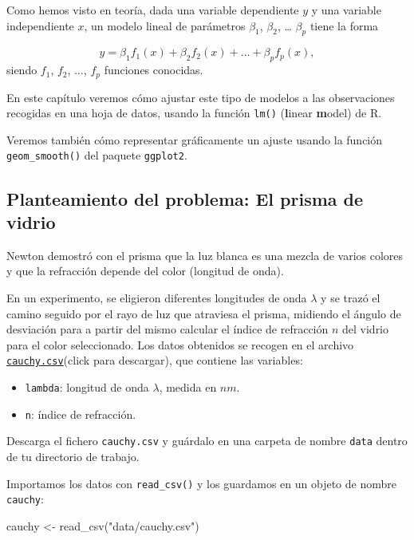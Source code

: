 \documentclass[
  degree=mecinf,
  title=normal,
  toc=normal,
  bib=normal]{mnye}
\newenvironment{Shaded}{\begin{snugshade}}{\end{snugshade}}
\newcommand{\FunctionTok}[1]{\textcolor[rgb]{0.00,0.00,0.00}{#1}}
\newcommand{\NormalTok}[1]{#1}
\newcommand{\OtherTok}[1]{\textcolor[rgb]{0.56,0.35,0.01}{#1}}
\newcommand{\StringTok}[1]{\textcolor[rgb]{0.31,0.60,0.02}{#1}}
\begin{document}
Como hemos visto en teoría, dada una variable dependiente \(y\) y una variable independiente \(x\), un modelo lineal de parámetros \(\beta_1\), \(\beta_2\), \ldots{} \(\beta_p\) tiene la forma

\[
y = \beta_1 f_1(x) + \beta_2 f_2(x) + \dots +\beta_p f_p(x),
\]
siendo \(f_1\), \(f_2\), \(\dots\), \(f_p\) funciones conocidas.

En este capítulo veremos cómo ajustar este tipo de modelos a las observaciones recogidas en una hoja de datos, usando la función \texttt{lm()} (\textbf{l}inear \textbf{m}odel) de \textsf{R}.

Veremos también cómo representar gráficamente un ajuste usando la función \texttt{geom\_smooth()} del paquete \texttt{ggplot2}.

\hypertarget{planteamiento-del-problema-el-prisma-de-vidrio}{%
\subsection{Planteamiento del problema: El prisma de vidrio}\label{planteamiento-del-problema-el-prisma-de-vidrio}}

Newton demostró con el prisma que la luz blanca es una mezcla de varios colores y que la refracción depende del color (longitud de onda).

En un experimento, se eligieron diferentes longitudes de onda \(\lambda\) y se trazó el camino seguido por el rayo de luz que atraviesa el prisma, midiendo el ángulo de desviación para a partir del mismo calcular el índice de refracción \(n\) del vidrio para el color seleccionado. Los datos obtenidos se recogen en el archivo \href{https://drive.google.com/uc?export=download\&id=1fI5_KZA8MAiZVegFmtlQ7Cm4IzlGDQtg}{\texttt{cauchy.csv}}(click para descargar), que contiene las variables:

\begin{itemize}
\item
  \texttt{lambda}: longitud de onda \(\lambda\), medida en \(nm\).
\item
  \texttt{n}: índice de refracción.
\end{itemize}

Descarga el fichero \texttt{cauchy.csv} y guárdalo en una carpeta de nombre \texttt{data} dentro de tu directorio de trabajo.

Importamos los datos con \texttt{read\_csv()} y los guardamos en un objeto de nombre \texttt{cauchy}:

\begin{Shaded}
\begin{Highlighting}[]
\NormalTok{cauchy }\OtherTok{\textless{}{-}} \FunctionTok{read\_csv}\NormalTok{(}\StringTok{"data/cauchy.csv"}\NormalTok{)}
\end{Highlighting}
\end{Shaded}
\end{document}
